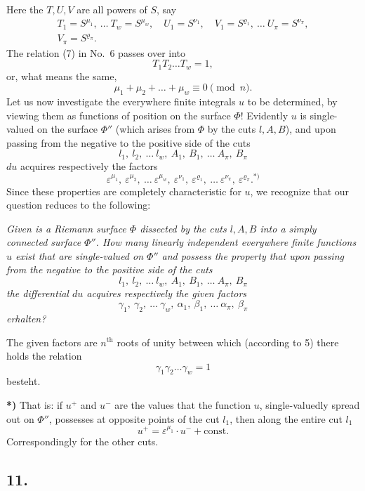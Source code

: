 \documentclass{article}
\begin{document}
Here the $T, U, V$ are all powers of $S$, say
\[
\begin{gathered}
T_1 = S^{\mu_1}, \ \dots \ T_w = S^{\mu_w}, \quad U_1 = S^{\nu_1}, \quad V_1 = S^{\varrho_1}, \ \dots \ U_\pi = S^{\nu_\pi}, \\
V_\pi = S^{\varrho_\pi}.
\end{gathered}
\tag{4}
\]
The relation (7) in No.~6 passes over into
\[
T_1 T_2 \dots T_w = 1,
\]
or, what means the same,
\[
\mu_1 + \mu_2 + \dots + \mu_w \equiv 0 \pmod n.
\tag{5}
\]
Let us now investigate the everywhere finite integrals $u$ to be determined, by viewing them as functions of position on the surface $\Phi$! Evidently $u$ is single-valued on the surface $\Phi''$ (which arises from $\Phi$ by the cuts $l, A, B$), and upon passing from the negative to the positive side of the cuts
\[
l_1, \ l_2, \ \dots \ l_w, \ A_1, \ B_1, \ \dots \ A_\pi, \ B_\pi
\]
$du$ acquires respectively the factors
\[
\varepsilon^{\mu_1}, \ \varepsilon^{\mu_2}, \ \dots \ \varepsilon^{\mu_w}, \ \varepsilon^{\nu_1}, \ \varepsilon^{\varrho_1}, \ \dots \ \varepsilon^{\nu_\pi}, \ \varepsilon^{\varrho_\pi}.{}^{*)}
\]
Since these properties are completely characteristic for $u$, we recognize that our question reduces to the following:

\emph{Given is a Riemann surface $\Phi$ dissected by the cuts $l, A, B$ into a simply connected surface $\Phi''$. How many linearly independent everywhere finite functions $u$ exist that are single-valued on $\Phi''$ and possess the property that upon passing from the negative to the positive side of the cuts}
\[
l_1, \ l_2, \ \dots \ l_w, \ A_1, \ B_1, \ \dots \ A_\pi, \ B_\pi
\]
\emph{the differential $du$ acquires respectively the given factors}
\[
\gamma_1, \ \gamma_2, \ \dots \ \gamma_w, \ \alpha_1, \ \beta_1, \ \dots \ \alpha_\pi, \ \beta_\pi
\]
\emph{erhalten?}

The given factors are $n^{\text{th}}$ roots of unity between which (according to 5) there holds the relation
\[
\gamma_1 \gamma_2 \dots \gamma_w = 1
\tag{6}
\]
besteht.

\textbf{*)} That is: if $u^+$ and $u^-$ are the values that the function $u$, single-valuedly spread out on $\Phi''$, possesses at opposite points of the cut $l_1$, then along the entire cut $l_1$
\[
u^+ = \varepsilon^{\mu_1} \cdot u^- + \text{const.}
\]
Correspondingly for the other cuts.

\subsection*{11.}
\end{document}
